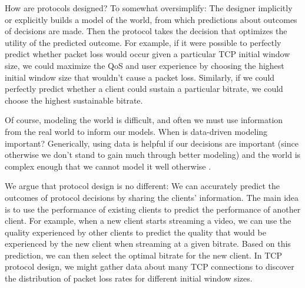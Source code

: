 
How are protocols designed?  To somewhat oversimplify: The designer implicitly or explicitly builds a model of the world, from which predictions about outcomes of decisions are made.  Then the protocol takes the decision that optimizes the utility of the predicted outcome.  For example, if it were possible to perfectly predict whether packet loss would occur given a particular TCP initial window size, we could maximize the QoS and user experience by choosing the highest initial window size that wouldn't cause a packet loss.  Similarly, if we could perfectly predict whether a client could sustain a particular bitrate, we could choose the highest sustainable bitrate.

Of course, modeling the world is difficult, and often we must use information from the real world to inform our models.  When is data-driven modeling important?  Generically, using data is helpful if our decisions are important (since otherwise we don't stand to gain much through better modeling) and the world is complex enough that we cannot model it well otherwise .

We argue that protocol design is no different: We can accurately predict the outcomes of protocol decisions by sharing the clients' information. The main idea is to use the performance of existing clients to predict the performance of another client. For example, when a new client starts streaming a video, we can use the quality experienced by other clients to predict the quality that would be experienced by the new client when streaming at a given bitrate. Based on this prediction, we can then select the optimal bitrate for the new client.  In TCP protocol design, we might gather data about many TCP connections to discover the distribution of packet loss rates for different initial window sizes.  

